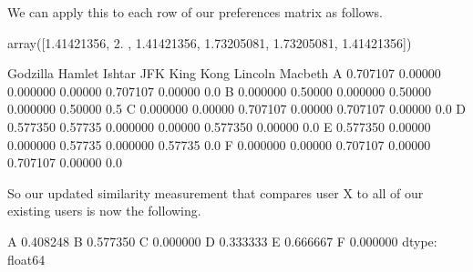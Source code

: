 \documentclass[letterpaper,10pt,english]{jupyterBook}
\begin{document}
\sphinxAtStartPar
We can apply this to each row of our preferences matrix as follows.

\begin{sphinxVerbatim}[commandchars=\\\{\}]
     
\end{sphinxVerbatim}

\begin{sphinxVerbatim}[commandchars=\\\{\}]
array([1.41421356, 2.        , 1.41421356, 1.73205081, 1.73205081,
       1.41421356])
\end{sphinxVerbatim}

\begin{sphinxVerbatim}[commandchars=\\\{\}]
     
\end{sphinxVerbatim}

\begin{sphinxVerbatim}[commandchars=\\\{\}]
   Godzilla   Hamlet    Ishtar      JFK  King Kong  Lincoln  Macbeth
A  0.707107  0.00000  0.000000  0.00000   0.707107  0.00000      0.0
B  0.000000  0.50000  0.000000  0.50000   0.000000  0.50000      0.5
C  0.000000  0.00000  0.707107  0.00000   0.707107  0.00000      0.0
D  0.577350  0.57735  0.000000  0.00000   0.577350  0.00000      0.0
E  0.577350  0.00000  0.000000  0.57735   0.000000  0.57735      0.0
F  0.000000  0.00000  0.707107  0.00000   0.707107  0.00000      0.0
\end{sphinxVerbatim}

\sphinxAtStartPar
So our updated similarity measurement that compares user X to all of our existing users is now the following.

\begin{sphinxVerbatim}[commandchars=\\\{\}]
  
\end{sphinxVerbatim}

\begin{sphinxVerbatim}[commandchars=\\\{\}]
A    0.408248
B    0.577350
C    0.000000
D    0.333333
E    0.666667
F    0.000000
dtype: float64
\end{sphinxVerbatim}
\end{document}
